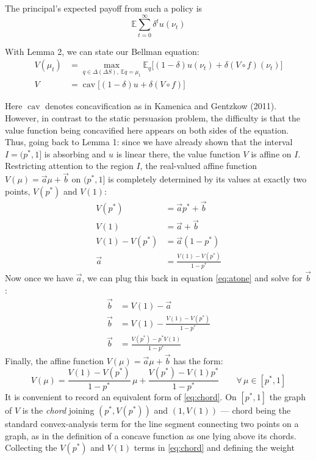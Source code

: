 \documentclass[12pt]{article}
\DeclareMathOperator{\cav}{cav}
\begin{document}
The principal's expected payoff from such a policy is
\[
\mathbb{E}\sum_{t=0}^{\infty}\delta^t u(\nu_t)
\]

With Lemma 2, we can state our Bellman equation:
\begin{align}
V(\mu_t) &= \max_{q\in\Delta(\Delta S),\ \mathbb{E}q=\mu_t} \mathbb{E}_q\big[(1-\delta)u(\nu_t) + \delta(V\circ f)(\nu_t)\big] \label{eq:bellman}\\
V &= \cav\big[(1-\delta)u + \delta(V\circ f)\big] \label{eq:cav}
\end{align}

Here $\cav$ denotes concavification as in Kamenica and Gentzkow (2011). However, in contrast to the static persuasion problem, the difficulty is that the value function being concavified here appears on both sides of the equation. Thus, going back to Lemma 1: since we have already shown that the interval $I=(p^*,1]$ is absorbing and $u$ is linear there, the value function $V$ is affine on $I$. Restricting attention to the region $I$, the real-valued affine function $V(\mu) = \vec{a}\mu + \vec{b}$ on $(p^*,1]$ is completely determined by its values at exactly two points, $V(p^*)$ and $V(1)$:
\begin{align}
V(p^*) &= \vec{a}p^* + \vec{b} \label{eq:atpstar}\\
V(1) &= \vec{a} + \vec{b} \label{eq:atone}\\
V(1)-V(p^*) &= \vec{a}(1-p^*) \nonumber\\
\vec{a} &= \frac{V(1)-V(p^*)}{1-p^*} \label{eq:slope}
\end{align}
Now once we have $\vec{a}$, we can plug this back in equation \eqref{eq:atone} and solve for $\vec{b}$:
\begin{align}
\vec{b} &= V(1) - \vec{a} \nonumber\\
\vec{b} &= V(1) - \frac{V(1)-V(p^*)}{1-p^*} \nonumber\\
\vec{b} &= \frac{V(p^*) - p^*V(1)}{1-p^*} \label{eq:intercept}
\end{align}
Finally, the affine function $V(\mu) = \vec{a}\mu + \vec{b}$ has the form:
\begin{equation}\label{eq:chord}
V(\mu) = \frac{V(1)-V(p^*)}{1-p^*}\,\mu + \frac{V(p^*)-V(1)p^*}{1-p^*}
\qquad \forall\,\mu\in[p^*,1]
\end{equation}
It is convenient to record an equivalent form of \eqref{eq:chord}. On $[p^*,1]$ the graph of $V$ is the \emph{chord} joining $(p^*,V(p^*))$ and $(1,V(1))$ --- chord being the standard convex-analysis term for the line segment connecting two points on a graph, as in the definition of a concave function as one lying above its chords. Collecting the $V(p^*)$ and $V(1)$ terms in \eqref{eq:chord} and defining the weight
\end{document}
